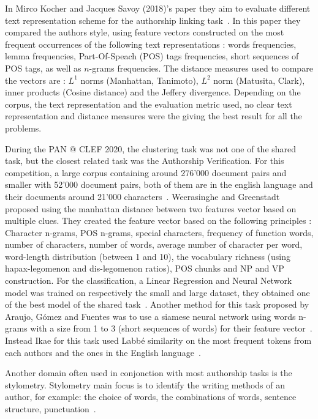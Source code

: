 In Mirco Kocher and Jacques Savoy (2018)'s paper they aim to evaluate different text representation scheme for the authorship linking task~\cite{kocher_linking}.
In this paper they compared the authors style, using feature vectors constructed on the most frequent occurrences of the following text representations : words frequencies, lemma frequencies, Part-Of-Speach (POS) tags frequencies, short sequences of POS tags, as well as $n$-grams frequencies.
The distance measures used to compare the vectors are : $L^1$ norms (Manhattan, Tanimoto), $L^2$ norm (Matusita, Clark), inner products (Cosine distance) and the Jeffery divergence.
Depending on the corpus, the text representation and the evaluation metric used, no clear text representation and distance measures were the giving the best result for all the problems.

During the PAN @ CLEF 2020, the clustering task was not one of the shared task, but the closest related task was the Authorship Verification.
For this competition, a large corpus containing around 276'000 document pairs and smaller with 52'000 document pairs, both of them are in the english language and their documents around 21'000 characters~\cite{overview_pan20}.
Weerasinghe and Greenstadt proposed using the manhattan distance between two features vector based on multiple clues.
They created the feature vector based on the following principles : Character n-grams, POS n-grams, special characters, frequency of function words, number of characters, number of words, average number of character per word, word-length distribution (between 1 and 10), the vocabulary richness (using hapax-legomenon and dis-legomenon ratios), POS chunks and NP and VP construction.
For the classification, a Linear Regression and Neural Network model was trained on respectively the small and large dataset, they obtained one of the best  model of the shared task~\cite{feature_vector_pan20}.
Another method for this task proposed by Araujo, Gómez and Fuentes was to use a siamese neural network using words n-grams with a size from 1 to 3 (short sequences of words) for their feature vector~\cite{siamese_network_pan20}.
Instead Ikae for this task used Labbé similarity on the most frequent tokens from each authors and the ones in the English language~\cite{unine_pan20}.

Another domain often used in conjonction with most authorship tasks is the stylometry.
Stylometry main focus is to identify the writing methods of an author, for example: the choice of words, the combinations of words, sentence structure, punctuation~\cite{savoy_stylo}.
